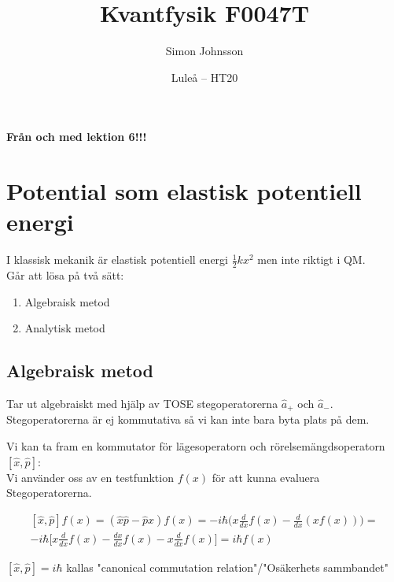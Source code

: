 \documentclass{article}
\begin{document}
  \title{Kvantfysik F0047T}
  \author{Simon Johnsson}
  \date{Luleå -- HT20}
  \maketitle

  \textbf{Från och med lektion 6!!!}
  \section{Potential som elastisk potentiell energi}
  I klassisk mekanik är elastisk potentiell energi $\frac{1}{2}kx^2$ men inte riktigt i QM.\\

  Går att lösa på två sätt:
  \begin{enumerate}
    \item Algebraisk metod
    \item Analytisk metod
  \end{enumerate}

  \subsection{Algebraisk metod}
  Tar ut algebraiskt med hjälp av TOSE stegoperatorerna $\hat{a}_+$ och $\hat{a}_-$. Stegoperatorerna är ej kommutativa så vi kan inte bara byta plats på dem.

  Vi kan ta fram en kommutator för lägesoperatorn och rörelsemängdsoperatorn $[\hat{x},\hat{p}]$:\\
  Vi använder oss av en testfunktion $f(x)$ för att kunna evaluera Stegoperatorerna.

  \[
    \begin{split}
      [\hat{x},\hat{p}]f(x)=(\hat{x}\hat{p}-\hat{p}\hat{x})f(x)=-i\hbar\bigg(x\frac{d}{dx}f(x)-\frac{d}{dx}(xf(x))\bigg)=\\
      -i\hbar\bigg[x\frac{d}{dx}f(x)-\frac{dx}{dx}f(x)-x\frac{d}{dx}f(x)\bigg]=i\hbar f(x)
    \end{split}
  \]

  $[\hat{x},\hat{p}]=i\hbar$ kallas "canonical commutation relation"/"Osäkerhets sammbandet"\\
\end{document}
